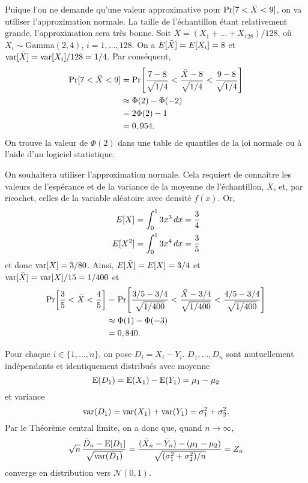 \begin{solution}{2.19}
    Puique l'on ne demande qu'une valeur approximative pour $\mathrm{Pr} [ 7 <
      \bar{X} < 9 ]$, on va utiliser l'approximation normale. La taille
    de l'échantillon étant relativement grande, l'approximation sera
    très bonne. Soit $\bar{X} = (X_1 + \dots + X_{128})/128$, où $X_i
    \sim \text{Gamma}(2, 4)$, $i = 1, \dots, 128$. On a
    $E [ \bar{X} ] = E [ X_i ] = 8$ et $\mathrm{var} [ \bar{X} ] = \mathrm{var} [ X_i ]/128
    = 1/4$. Par conséquent,
    \begin{align*}
      \mathrm{Pr} [ 7 < \bar{X} < 9 ]
        &= \mathrm{Pr}\! \left[ \frac{7 - 8}{\sqrt{1/4}} <
          \frac{\bar{X} - 8}{\sqrt{1/4}} <
          \frac{9 - 8}{\sqrt{1/4}} \right] \\
      &\approx \Phi(2) - \Phi(-2) \\
      &= 2 \Phi(2) - 1 \\
      &= 0,954.
    \end{align*}
    On trouve la valeur de $\Phi(2)$ dans une table de quantiles de
    la loi normale ou à l'aide d'un logiciel statistique.
  
\end{solution}
\begin{solution}{2.20}
    On souhaitera utiliser l'approximation normale. Cela requiert de
    connaître les valeurs de l'espérance et de la variance de la
    moyenne de l'échantillon, $\bar{X}$, et, par ricochet, celles de
    la variable aléatoire avec densité $f(x)$. Or,
    \begin{align*}
      E [ X ] &= \int_0^1 3x^3\,dx = \frac{3}{4} \\
      E [ X^2 ] &= \int_0^1 3x^4\,dx = \frac{3}{5}
    \end{align*}
    et donc $\mathrm{var} [ X ] = 3/80$. Ainsi, $E [ \bar{X} ] = E [ X ] = 3/4$
    et $\mathrm{var} [ \bar{X} ] = \mathrm{var} [ X ]/15 = 1/400$ et
    \begin{align*}
      \mathrm{Pr}\! \left[ \frac{3}{5} < \bar{X} < \frac{4}{5} \right]
      &= \mathrm{Pr}\! \left[ \frac{3/5 - 3/4}{\sqrt{1/400}} <
        \frac{\bar{X} - 3/4}{\sqrt{1/400}} <
        \frac{4/5 - 3/4}{\sqrt{1/400}} \right] \\
      &\approx \Phi(1) - \Phi(-3) \\
      &= 0,840.
    \end{align*}
  
\end{solution}
\begin{solution}{2.21}
Pour chaque $i \in \{1,\dots, n \}$, on pose $D_i = X_i - Y_i$. $D_1, \ldots, D_n$ sont mutuellement indépendants et identiquement distribués avec moyenne
$$
\operatorname{E}(D_1) = \operatorname{E}(X_1) - \operatorname{E}(Y_1) = \mu_1 - \mu_2
$$
et variance
$$
\operatorname{var}(D_1) = \operatorname{var}(X_1) + \operatorname{var}(Y_1) = \sigma_1^2 + \sigma_2^2.
$$
Par le Théorème central limite, on a donc que, quand $n \to \infty$,
$$
\sqrt{n} \, \frac{\bar D_n - \operatorname{E}[D_1]}{\sqrt{\operatorname{var}(D_1)}} = \frac{(\bar X_n - \bar Y_n) - (\mu_1 -\mu_2)}{\sqrt{(\sigma_1^2 + \sigma_2^2)/n}} = Z_n
$$
converge en distribution vers $\mathcal{N}(0,1)$.
\end{solution}
